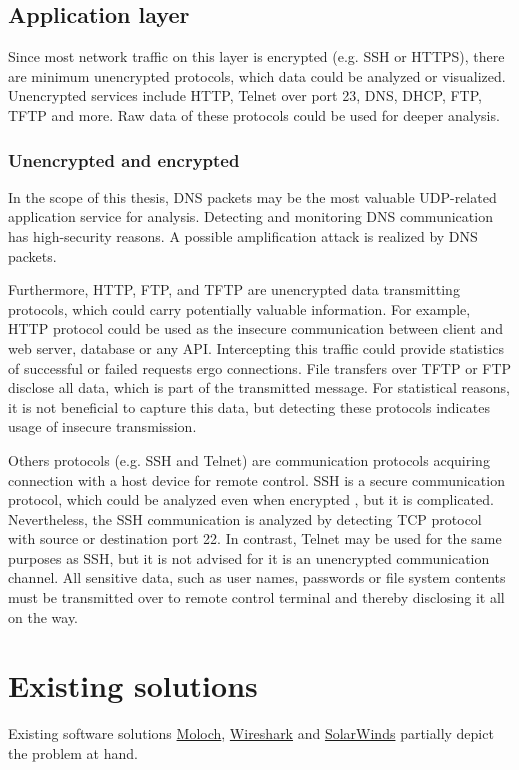 \documentclass[12pt,a4paper,twoside]{book}
\begin{document}
        \subsection{Application layer} \label{analysis:data:application}
            Since most network traffic on this layer is encrypted (e.g. SSH or HTTPS), there are minimum unencrypted protocols, which data could be analyzed or visualized. Unencrypted services include HTTP, Telnet over port 23, DNS, DHCP, FTP, TFTP and more. Raw data of these protocols could be used for deeper analysis.\par
            \subsubsection{Unencrypted and encrypted} \label{analysis:data:application:encr}
                In the scope of this thesis, DNS packets may be the most valuable UDP-related application service for analysis. Detecting and monitoring DNS communication has high-security reasons. A possible amplification attack is realized by DNS packets.\par
                Furthermore, HTTP, FTP, and TFTP are unencrypted data transmitting protocols, which could carry potentially valuable information. For example, HTTP protocol could be used as the insecure communication between client and web server, database or any API. Intercepting this traffic could provide statistics of successful or failed requests ergo connections. File transfers over TFTP or FTP disclose all data, which is part of the transmitted message. For statistical reasons, it is not beneficial to capture this data, but detecting these protocols indicates usage of insecure transmission.\par
                Others protocols (e.g. SSH and Telnet) are communication protocols acquiring connection with a host device for remote control. SSH is a secure communication protocol, which could be analyzed even when encrypted \cite{web:ssh}, but it is complicated. Nevertheless, the SSH communication is analyzed by detecting TCP protocol with source or destination port 22. In contrast, Telnet may be used for the same purposes as SSH, but it is not advised for it is an unencrypted communication channel. All sensitive data, such as user names, passwords or file system contents must be transmitted over to remote control terminal and thereby disclosing it all on the way.
    \section{Existing solutions} \label{analysis:solutions}
        Existing software solutions \hyperref[analysis:solutions:moloch]{Moloch}, \hyperref[analysis:solutions:wireshark]{Wireshark} and \hyperref[analysis:solutions:solarwinds]{SolarWinds} partially depict the problem at hand.
\end{document}

